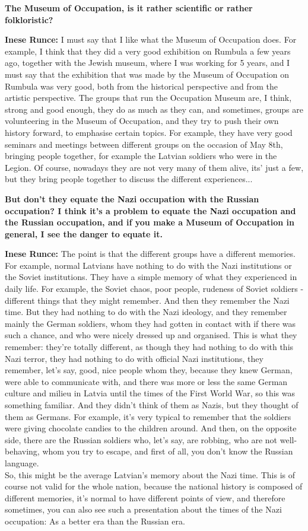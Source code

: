 \textbf{The Museum of Occupation, is it rather scientific or rather folkloristic?}

\textbf{Inese Runce:} I must say that I like what the Museum of Occupation does. For example, I think that they did a very good exhibition on Rumbula a few years ago, together with the Jewish museum, where I was working for 5 years, and I must say that the exhibition that was made by the Museum of Occupation on Rumbula was very good, both from the historical perspective and from the artistic perspective. The groups that run the Occupation Museum are, I think, strong and good enough, they do as much as they can, and sometimes, groups are volunteering in the Museum of Occupation, and they try to push their own  history forward, to emphasise certain topics. For example, they have very good seminars and meetings between different groups on the occasion of May 8th, bringing people together, for example the Latvian soldiers who were in the Legion. Of course, nowadays they are not very many of them alive, its' just a few, but they bring people together to discuss the different experiences...

\textbf{But don't they equate the Nazi occupation with the Russian occupation? I think it's a problem to equate the Nazi occupation and the Russian occupation, and if you make a Museum of Occupation in general, I see the danger to equate it.} 
 
\textbf{Inese Runce:} The point is that the different groups have a different memories. For example, normal Latvians have nothing to do with the Nazi institutions or the Soviet institutions. They have a simple memory of what they experienced in daily life.  For example, the Soviet chaos, poor people, rudeness of Soviet soldiers - different things that they might remember. And then they remember the Nazi time. But they had nothing to do with the Nazi ideology, and they remember mainly the German soldiers, whom they had gotten in contact with if there was such a chance, and who were nicely  dressed up and organised. This is what they remember: they're totally different, as though they had nothing to do with this Nazi terror, they had nothing to do with official Nazi institutions, they remember, let's say, good, nice people whom they, because they knew German, were able to communicate with, and there was more or less the same German culture and milieu in Latvia until the times of the First World War, so this was something familiar. And they didn't think of them as Nazis, but they thought of them as Germans. For example,  it's very typical to remember that the soldiers were giving chocolate  candies to the children around. And then, on the opposite side, there are the Russian soldiers who, let's say, are robbing, who are not well-behaving, whom you try to escape, and first of all, you don't know the Russian language. \\
So, this might be the average Latvian's memory about the Nazi time. This is of course not valid for the whole nation, because the national history is composed of different memories, it’s normal to have different points of view, and therefore sometimes, you can also see such a presentation about the times of the Nazi occupation: As a better era than the Russian era.
 
